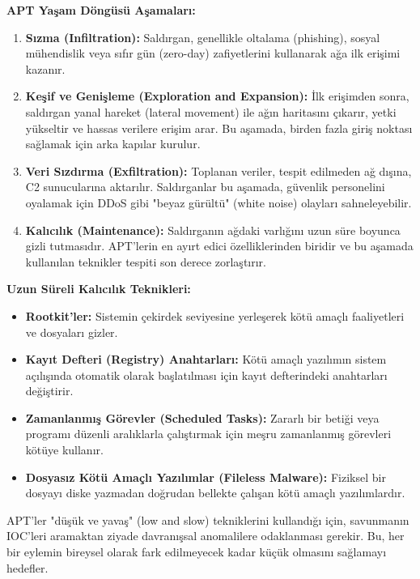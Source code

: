 \textbf{APT Yaşam Döngüsü Aşamaları:}

\begin{enumerate}
    \item \textbf{Sızma (Infiltration):} Saldırgan, genellikle oltalama (phishing), sosyal mühendislik veya sıfır gün (zero-day) zafiyetlerini kullanarak ağa ilk erişimi kazanır.
    \item \textbf{Keşif ve Genişleme (Exploration and Expansion):} İlk erişimden sonra, saldırgan yanal hareket (lateral movement) ile ağın haritasını çıkarır, yetki yükseltir ve hassas verilere erişim arar. Bu aşamada, birden fazla giriş noktası sağlamak için arka kapılar kurulur.
    \item \textbf{Veri Sızdırma (Exfiltration):} Toplanan veriler, tespit edilmeden ağ dışına, C2 sunucularına aktarılır. Saldırganlar bu aşamada, güvenlik personelini oyalamak için DDoS gibi "beyaz gürültü" (white noise) olayları sahneleyebilir.
    \item \textbf{Kalıcılık (Maintenance):} Saldırganın ağdaki varlığını uzun süre boyunca gizli tutmasıdır. APT'lerin en ayırt edici özelliklerinden biridir ve bu aşamada kullanılan teknikler tespiti son derece zorlaştırır.
\end{enumerate}

\textbf{Uzun Süreli Kalıcılık Teknikleri:}

\begin{itemize}
    \item \textbf{Rootkit'ler:} Sistemin çekirdek seviyesine yerleşerek kötü amaçlı faaliyetleri ve dosyaları gizler.
    \item \textbf{Kayıt Defteri (Registry) Anahtarları:} Kötü amaçlı yazılımın sistem açılışında otomatik olarak başlatılması için kayıt defterindeki anahtarları değiştirir.
    \item \textbf{Zamanlanmış Görevler (Scheduled Tasks):} Zararlı bir betiği veya programı düzenli aralıklarla çalıştırmak için meşru zamanlanmış görevleri kötüye kullanır.
    \item \textbf{Dosyasız Kötü Amaçlı Yazılımlar (Fileless Malware):} Fiziksel bir dosyayı diske yazmadan doğrudan bellekte çalışan kötü amaçlı yazılımlardır.
\end{itemize}

APT'ler "düşük ve yavaş" (low and slow) tekniklerini kullandığı için, savunmanın IOC'leri aramaktan ziyade davranışsal anomalilere odaklanması gerekir. Bu, her bir eylemin bireysel olarak fark edilmeyecek kadar küçük olmasını sağlamayı hedefler.

